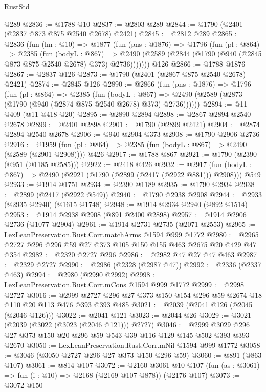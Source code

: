 \begin{lexlean}{RustStd}
\begin{coremodule}
    @289
@2836 := @1788 @10
@2837 := @2803 @289
@2844 := @1790 (@2401 (@2837 @873 @875 @2540 @2678) @2421)
@2845 := @2812 @289
@2865 := @2836
    (fun (hn : @10) =>
    @1877
      (fun (pns : @1876) =>
      @1796
        (fun (pl : @864) =>
        @2385
          (fun (bodyL : @867) =>
          @2490 (@2589 (@2844 (@1790 (@940 (@2845 @873 @875 @2540 @2678) @373) @2736)))))))
    @126
@2866 := @1788 @1876
@2867 := @2837 @126
@2873 := @1790 (@2401 (@2867 @875 @2540 @2678) @2421)
@2874 := @2845 @126
@2890 := @2866
    (fun (pns : @1876) =>
    @1796
      (fun (pl : @864) =>
      @2385
        (fun (bodyL : @867) =>
        @2490 (@2589 (@2873 (@1790 (@940 (@2874 @875 @2540 @2678) @373) @2736))))))
@2894 := @11 @409 (@11 @418 @20)
@2895 := @2890 @2894
@2898 := @2867 @2894 @2540 @2678
@2899 := @2401 @2898
@2901 := @1790 (@2899 @2421)
@2904 := @2874 @2894 @2540 @2678
@2906 := @940 @2904 @373
@2908 := @1790 @2906 @2736
@2916 := @1959 (fun (pl : @864) => @2385 (fun (bodyL : @867) => @2490 (@2589 (@2901 @2908)))) @426
@2917 := @1788 @867
@2921 := @1790 (@2390 (@951 (@1185 @2585)))
@2922 := @2418 @426
@2932 := @2917 (fun (bodyL : @867) => @2490 (@2921 (@1790 (@2899 (@2417 (@2922 @881))) @2908))) @549
@2933 := @1914 @1751
@2934 := @2390 @1189
@2935 := @1790 @2934
@2938 := @2899 (@2417 (@2922 @549))
@2940 := @1790 @2938 @2908
@2944 := @2933 (@2935 @2940) (@1615 @1748)
@2948 := @1914 @2934 @2940 (@892 @1514)
@2953 := @1914 @2938 @2908 (@891 @2400 @2898)
@2957 := @1914 @2906 @2736 (@1077 @2904)
@2961 := @1914 @2731 @2735 (@2071 @2553)
@2965 := LexLeanPreservation.Rust.Corr.matchArms @1594 @999 @1772
@2980 := @2965 @2727 @296 @296 @59 @27 @373 @105 @150 @155 @463 @2675 @20 @429 @47 @354
@2982 := @2320 @2727 @296
@2986 := @2982 @47 @27 @47 @463
@2987 := @2329 @2727
@2990 := @2986 (@2328 (@2987 @47))
@2992 := @2336 (@2337 @463)
@2994 := @2980 (@2990 @2992)
@2998 := LexLeanPreservation.Rust.Corr.mCons @1594 @999 @1772
@2999 := @2998 @2727
@3016 := @2999 @2727 @296 @27 @373 @150 @154 @296 @59 @2674 @18 @110 @20 @113 @476 @393 @393 @485
@3021 := @2039 (@2041 @126 (@2045 (@2046 @126)))
@3022 := @2041 @121
@3023 := @2044 @26
@3029 := @3021 (@2039 (@3022 (@3023 (@2046 @121))) @2727)
@3046 := @2999 @3029 @296 @27 @373 @150 @20 @296 @59 @543 @39 @116 @129 @145 @502 @393 @393 @2670
@3050 := LexLeanPreservation.Rust.Corr.mNil @1594 @999 @1772
@3058 := @3046 (@3050 @2727 @296 @27 @373 @150 @296 @59)
@3060 := @891 (@863 @107)
@3061 := @814 @107
@3072 := @2160
    @3061
    @10
    @107
    (fun (as : @3061) => fun (i : @10) => @2168 (@2169 @107 @878))
    (@2176 @107)
@3073 := @3072 @150

\end{coremodule}
\end{lexlean}
